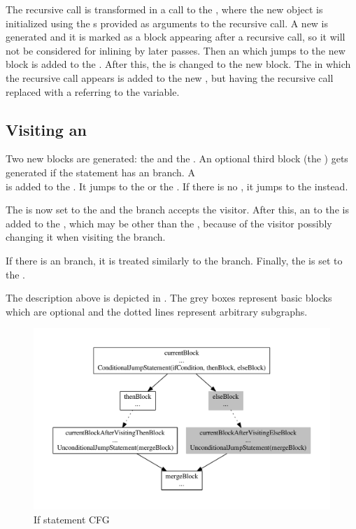 The recursive call is transformed in a  call to the , where the new  object is
initialized using the s provided as arguments to the recursive call. A new  is generated
and it is marked as a block appearing after a recursive call, so it will not be considered for inlining by later passes.
Then an  which jumps to the new block is added to the . After this,
the  is changed to the new block. The  in which the recursive call appears is
added to the new , but having the recursive call replaced with a  referring to
the  variable.

\subsection{Visiting an }

Two new blocks are generated: the  and the . An optional third block (the
) gets generated if the  statement has an  branch. A\\
 is added to the . It jumps to the  or the
. If there is no , it jumps to the  instead.

The  is now set to the  and the  branch accepts the visitor. After this,
an  to the  is added to the , which may be other
than the , because of the visitor possibly changing it when visiting the  branch.

If there is an  branch, it is treated similarly to the  branch. Finally, the 
is set to the .

The description above is depicted in . The grey boxes represent basic blocks
which are optional and the dotted lines represent arbitrary subgraphs.

\begin{figure}
    \centering
    \includegraphics[width=\textwidth]{src/graph/graph.pdf}
    \caption{If statement CFG\label{img:if-statement}}
\end{figure}